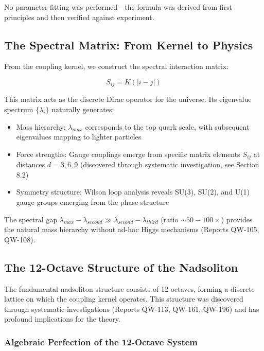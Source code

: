 \documentclass[11pt, a4paper]{article}
\begin{document}
No parameter fitting was performed—the formula was derived from first principles and then verified against experiment.

\subsection{The Spectral Matrix: From Kernel to Physics}

From the coupling kernel, we construct the spectral interaction matrix:

\begin{equation}
S_{ij} = K(|i-j|)
\label{eq:spectral_matrix}
\end{equation}

This matrix acts as the discrete Dirac operator for the universe. Its eigenvalue spectrum $\{\lambda_i\}$ naturally generates:
\begin{itemize}
    \item Mass hierarchy: $\lambda_{max}$ corresponds to the top quark scale, with subsequent eigenvalues mapping to lighter particles
    \item Force strengths: Gauge couplings emerge from specific matrix elements $S_{ij}$ at distances $d = 3, 6, 9$ (discovered through systematic investigation, see Section 8.2)
    \item Symmetry structure: Wilson loop analysis reveals SU(3), SU(2), and U(1) gauge groups emerging from the phase structure
\end{itemize}

The spectral gap $\lambda_{max} - \lambda_{second} \gg \lambda_{second} - \lambda_{third}$ (ratio $\sim 50-100\times$) provides the natural mass hierarchy without ad-hoc Higgs mechanisms (Reports QW-105, QW-108).

\subsection{The 12-Octave Structure of the Nadsoliton}

The fundamental nadsoliton structure consists of 12 octaves, forming a discrete lattice on which the coupling kernel operates. This structure was discovered through systematic investigations (Reports QW-113, QW-161, QW-196) and has profound implications for the theory.

\subsubsection{Algebraic Perfection of the 12-Octave System}
\end{document}
